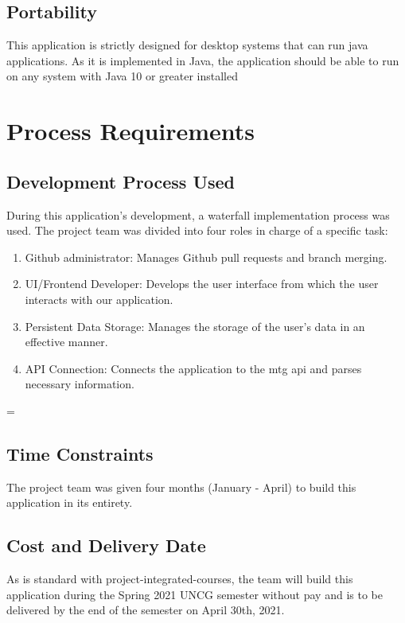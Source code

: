 \documentclass[12pt]{report}
\newcommand{\javaversion}{10 }
\newenvironment{unbroken}
{\par\nobreak\vfil\penalty0\vfilneg
	\vtop\bgroup}
{\par\xdef\tpd{\the\prevdepth}\egroup
	\prevdepth=\tpd}
\begin{document}
\subsection{Portability}
This application is strictly designed for desktop systems that can run java applications. As it is implemented in Java, the application should be able to run on any system with Java \javaversion or greater installed
\begin{unbroken}
\section{Process Requirements}
\subsection{Development Process Used}
During this application’s development, a waterfall implementation process was used. The project team was divided into four roles in charge of a 
specific task:
\begin{enumerate}
	\item Github administrator: Manages Github pull requests and branch merging.
	\item UI/Frontend Developer: Develops the user interface from which the user interacts with our application.
	\item Persistent Data Storage: Manages the storage of the user’s data in an effective manner.
	\item API Connection: Connects the application to the \acrshort{mtg} \acrshort{api} and parses necessary information.
\end{enumerate}
\end{unbroken}
\subsection{Time Constraints}
The project team was given four months (January - April) to build this application in its entirety.
\subsection{Cost and Delivery Date}
As is standard with project-integrated-courses, the team will build this 
application during the Spring 2021 UNCG semester without pay and is to be delivered by the end of the semester on April 30th, 2021. 
\end{document}
